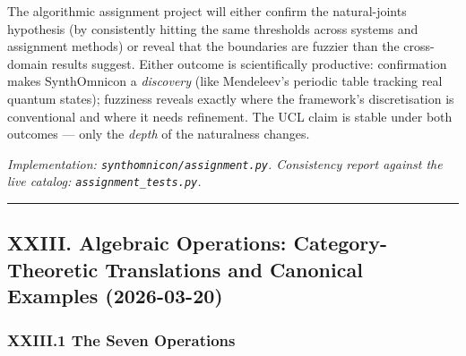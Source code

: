 \documentclass[12pt,a4paper]{article}
\begin{document}
The algorithmic assignment project will either confirm the natural-joints hypothesis (by consistently hitting the same thresholds across systems and assignment methods) or reveal that the boundaries are fuzzier than the cross-domain results suggest. Either outcome is scientifically productive: confirmation makes SynthOmnicon a \emph{discovery} (like Mendeleev's periodic table tracking real quantum states); fuzziness reveals exactly where the framework's discretisation is conventional and where it needs refinement. The UCL claim is stable under both outcomes --- only the \emph{depth} of the naturalness changes.

\emph{Implementation: \texttt{synthomnicon/assignment.py}. Consistency report against the live catalog: \texttt{assignment\_tests.py}.}

\begin{center}
\rule{0.5\textwidth}{0.4pt}
\end{center}

\subsection{XXIII. Algebraic Operations: Category-Theoretic Translations and Canonical Examples (2026-03-20)}

\subsubsection{XXIII.1 The Seven Operations}
\end{document}
